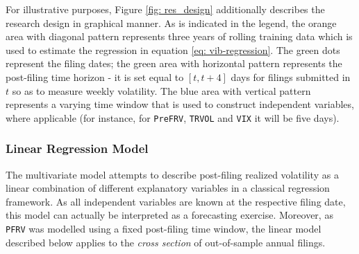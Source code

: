 For illustrative purposes, Figure \ref{fig: res_design} additionally describes the research design in graphical manner. As is indicated in the legend, the orange area with diagonal pattern represents three years of rolling training data which is used to estimate the regression in equation \eqref{eq: vib-regression}. The green dots represent the filing dates; the green area with horizontal pattern represents the post-filing time horizon - it is set equal to $[t, t+4]$ days for filings submitted in $t$ so as to measure weekly volatility. The blue area with vertical pattern represents a varying time window that is used to construct independent variables, where applicable (for instance, for \texttt{PreFRV}, \texttt{TRVOL} and \texttt{VIX} it will be five days).

\subsubsection{Linear Regression Model}
\label{sssec: volamodel_models_linreg}
The multivariate model attempts to describe post-filing realized volatility as a linear combination of different explanatory variables in a classical regression framework. As all independent variables are known at the respective filing date, this model can actually be interpreted as a forecasting exercise. Moreover, as \texttt{PFRV} was modelled using a fixed post-filing time window, the linear model described below applies to the \textit{cross section} of out-of-sample annual filings.

